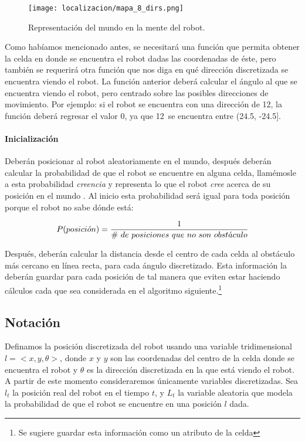 \begin{figure}
  \centering
  \texttt{[image: localizacion/mapa\_8\_dirs.png]}
  \caption{Representación del mundo en la mente del robot.}
  \label{fig:mapa2}
\end{figure}

Como habíamos mencionado antes, se necesitará una función que permita obtener la celda en donde se encuentra el robot dadas las coordenadas de éste, pero también se requerirá otra función que nos diga en qué dirección discretizada se encuentra viendo el robot. La función anterior deberá calcular el ángulo al que se encuentra viendo el robot, pero centrado sobre las posibles direcciones de movimiento. Por ejemplo: si el robot se encuentra con una dirección de 12\degree, la función deberá regresar el valor 0\degree, ya que 12\degree \ se encuentra entre (24.5\degree, -24.5\degree].\par

\paragraph{Inicialización}

Deberán posicionar al robot aleatoriamente en el mundo, después deberán calcular la probabilidad de que el robot se encuentre en alguna celda, llamémosle a esta probabilidad \textit{creencia} y representa lo que el robot \textit{cree} acerca de su posición en el mundo \parencite{Dieter1999}. Al inicio esta probabilidad será igual para toda posición porque el robot no sabe dónde está:

\[ P(posici\acute{o}n) = {1 \over \# \ de\ posiciones\ que\ no\ son\ obst\acute{a}culo}\]\medskip

Después, deberán calcular la distancia desde el centro de cada celda al obstáculo más cercano en línea recta, para cada ángulo discretizado. Esta información la deberán guardar para cada posición de tal manera que eviten estar haciendo cálculos cada que sea considerada en el algoritmo siguiente.\footnote{Se sugiere guardar esta información como un atributo de la celda}

\subsection{Notaci\'on}

Definamos la posición discretizada del robot usando una variable tridimensional $l = <x,y,\theta>$, donde $x$ y $y$ son las coordenadas del centro de la celda donde se encuentra el robot y $\theta$ es la dirección discretizada en la que está viendo el robot. A partir de este momento consideraremos únicamente variables discretizadas. Sea $l_t$ la posición real del robot en el tiempo $t$, y $L_t$ la variable aleatoria que modela la probabilidad de que el robot se encuentre en una posición $l$ dada.

